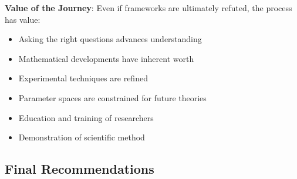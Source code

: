 \textbf{Value of the Journey}:
Even if frameworks are ultimately refuted, the process has value:
\begin{itemize}
    \item Asking the right questions advances understanding
    \item Mathematical developments have inherent worth
    \item Experimental techniques are refined
    \item Parameter spaces are constrained for future theories
    \item Education and training of researchers
    \item Demonstration of scientific method
\end{itemize}

\subsection{Final Recommendations}

